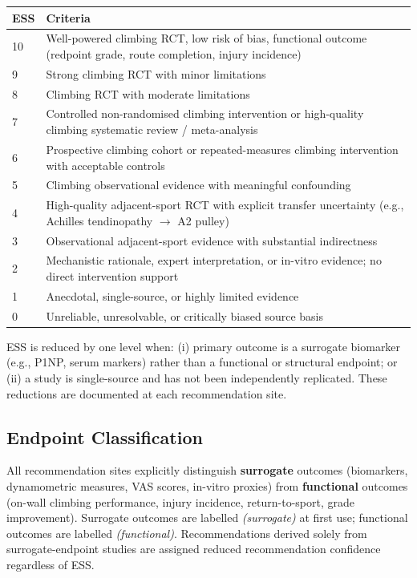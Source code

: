 \begin{center}
\small
\begin{tabular}{>{\raggedright}p{1.2cm} >{\raggedright\arraybackslash}p{12cm}}
\toprule
\textbf{ESS} & \textbf{Criteria} \\
\midrule
10 & Well-powered climbing RCT, low risk of bias, functional outcome (redpoint grade, route completion, injury incidence) \\
9  & Strong climbing RCT with minor limitations \\
8  & Climbing RCT with moderate limitations \\
7  & Controlled non-randomised climbing intervention or high-quality climbing systematic review / meta-analysis \\
6  & Prospective climbing cohort or repeated-measures climbing intervention with acceptable controls \\
5  & Climbing observational evidence with meaningful confounding \\
4  & High-quality adjacent-sport RCT with explicit transfer uncertainty (e.g., Achilles tendinopathy $\to$ A2 pulley) \\
3  & Observational adjacent-sport evidence with substantial indirectness \\
2  & Mechanistic rationale, expert interpretation, or in-vitro evidence; no direct intervention support \\
1  & Anecdotal, single-source, or highly limited evidence \\
0  & Unreliable, unresolvable, or critically biased source basis \\
\bottomrule
\end{tabular}
\end{center}

\noindent ESS is reduced by one level when: (i) primary outcome is a surrogate biomarker (e.g., P1NP, serum markers) rather than a functional or structural endpoint; or (ii) a study is single-source and has not been independently replicated. These reductions are documented at each recommendation site.

\subsection*{Endpoint Classification}

All recommendation sites explicitly distinguish \textbf{surrogate} outcomes (biomarkers, dynamometric measures, VAS scores, in-vitro proxies) from \textbf{functional} outcomes (on-wall climbing performance, injury incidence, return-to-sport, grade improvement). Surrogate outcomes are labelled \textit{(surrogate)} at first use; functional outcomes are labelled \textit{(functional)}. Recommendations derived solely from surrogate-endpoint studies are assigned reduced recommendation confidence regardless of ESS.

